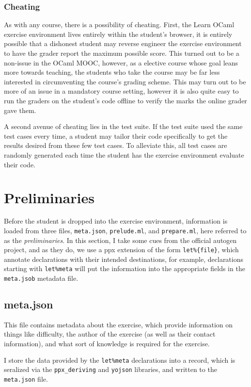 \documentclass[11pt]{article}
\begin{document}
\subsubsection{Cheating}
As with any course, there is a possibility of cheating. First, the Learn OCaml exercise environment lives entirely within the student's browser, it is entirely possible that a dishonest student may reverse engineer the exercise environment to have the grader report the maximum possible score. This turned out to be a non-issue in the OCaml MOOC, however, as a elective course whose goal leans more towards teaching, the students who take the course may be far less interested in circumventing the course's grading scheme. This may turn out to be more of an issue in a mandatory course setting, however it is also quite easy to run the graders on the student's code offline to verify the marks the online grader gave them.

A second avenue of cheating lies in the test suite. If the test suite used the same test cases every time, a student may tailor their code specifically to get the results desired from these few test cases. To alleviate this, all test cases are randomly generated each time the student has the exercise environment evaluate their code.

\section{Preliminaries}
Before the student is dropped into the exercise environment, information is loaded from three files, \verb+meta.json+, \verb+prelude.ml+, and \verb+prepare.ml+, here referred to as the \textit{preliminaries}. In this section, I take some cues from the official autogen project, and as they do, we use a ppx extension of the form \verb+let%{file}+, which annotate declarations with their intended destinations, for example, declarations starting with \verb+let%meta+ will put the information into the appropriate fields in the \verb+meta.jsob+ metadata file.

\subsection{meta.json}
This file contains metadata about the exercise, which provide information on things like difficulty, the author of the exercise (as well as their contact information), and what sort of knowledge is required for the exercise.

I store the data provided by the \verb+let%meta+ declarations into a record, which is seralized via the \verb+ppx_deriving+ and \verb+yojson+ libraries, and written to the \verb+meta.json+ file.
\end{document}
